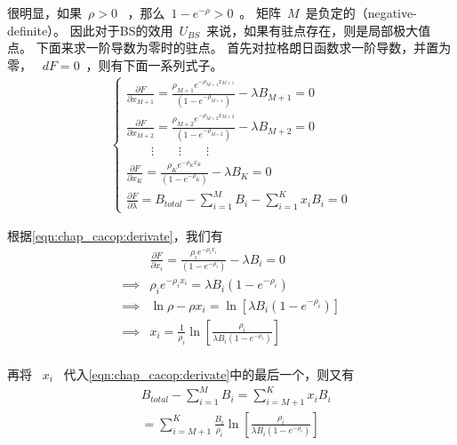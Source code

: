 很明显，如果~$\rho >0$~ ，那么~$1-e^{-\rho} >0$~。
矩阵~${M}$~是负定的（negative-definite）。
因此对于BS的效用~$U_{BS}$~来说，如果有驻点存在，则是局部极大值点。
下面来求一阶导数为零时的驻点。
首先对拉格朗日函数求一阶导数，并置为零，
~$dF = 0$~，则有下面一系列式子。
\begin{align} 
\begin{cases}
\frac{\partial F}{\partial x_{M+1}} =
\frac{\rho_{M+1} e^{-\rho_{M+1} x_{M+1}}}{(1-e^{-\rho_{M+1}})} - \lambda B_{M+1} = 0 \\
\frac{\partial F}{\partial x_{M+2}} =
\frac{\rho_{M+2} e^{-\rho_{M+2} x_{M+2}}}{(1-e^{-\rho_{M+2}})} - \lambda B_{M+2} = 0 \\
\qquad \vdots \qquad \vdots \qquad \vdots \\
\frac{\partial F}{\partial x_K} =
\frac{\rho_K e^{-\rho_K x_K}}{(1-e^{-\rho_K})} - \lambda B_K = 0 \\
\frac{\partial F}{\partial \lambda} = B_{total} - \sum_{i=1}^M B_i -
\sum^K_{i=1}x_iB_i = 0 
\end{cases}
\label{eqn:chap_cacop:derivate}
\end{align}


根据\eqref{eqn:chap_cacop:derivate}，我们有
\begin{equation*}
\begin{split}
&\frac{\partial F}{\partial x_i} = \frac{\rho_i e^{-\rho_i
x_i}}{(1-e^{-\rho_i})} - \lambda B_i = 0\\
\implies &\rho_i e^{-\rho_i x_i} =\lambda B_i(1-e^{-\rho_i})\\
\implies &\ln\rho - \rho x_i = \ln [\lambda B_i (1-e^{-\rho_i})]\\
\implies &x_i = \frac{1}{\rho_i} \ln \left[ \frac{\rho_i}{\lambda B_i(1-e^{-\rho_i})} \right] \\
\end{split}
\end{equation*}

再将 ~$x_i$~ 代入\eqref{eqn:chap_cacop:derivate}中的最后一个，则又有
%
\begin{equation}
\begin{split}
&B_{total} -\sum_{i=1}^MB_i = \sum_{i=M+1}^K x_i B_i \\
&= \sum_{i=M+1}^K \frac{B_i}{\rho_i} \ln \left[ \frac{\rho_i}{\lambda B_i(1-e^{-\rho_i})} \right] \\
\end{split}
\label{eqn_find_mu}
\end{equation}

